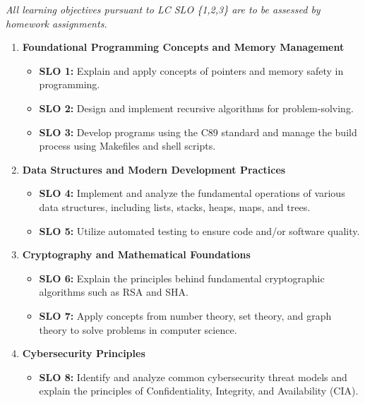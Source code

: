 \documentclass[11pt]{article}
\begin{document}
\textit{All learning objectives pursuant to LC SLO \{1,2,3\} are to be assessed by homework assignments.}

\begin{enumerate}
    \item \textbf{Foundational Programming Concepts and Memory Management}
        \begin{itemize}
            \item \textbf{SLO 1:} Explain and apply concepts of pointers and memory safety in programming.
            \item \textbf{SLO 2:} Design and implement recursive algorithms for problem-solving.
            \item \textbf{SLO 3:} Develop programs using the C89 standard and manage the build process using Makefiles and shell scripts.
        \end{itemize}
    \item \textbf{Data Structures and Modern Development Practices}
        \begin{itemize}
            \item \textbf{SLO 4:} Implement and analyze the fundamental operations of various data structures, including lists, stacks, heaps, maps, and trees.
            \item \textbf{SLO 5:} Utilize automated testing to ensure code and/or software quality.
        \end{itemize}
    \item \textbf{Cryptography and Mathematical Foundations}
        \begin{itemize}
            \item \textbf{SLO 6:} Explain the principles behind fundamental cryptographic algorithms such as RSA and SHA.
            \item \textbf{SLO 7:} Apply concepts from number theory, set theory, and graph theory to solve problems in computer science.
        \end{itemize}
    \item \textbf{Cybersecurity Principles}
        \begin{itemize}
            \item \textbf{SLO 8:} Identify and analyze common cybersecurity threat models and explain the principles of Confidentiality, Integrity, and Availability (CIA).
        \end{itemize}
\end{enumerate}

\end{document}
